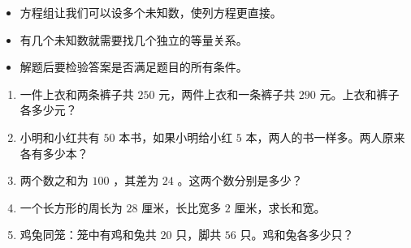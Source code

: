 \begin{keytakeaway}


\begin{itemize}
  \item 方程组让我们可以设多个未知数，使列方程更直接。
  \item 有几个未知数就需要找几个独立的等量关系。
  \item 解题后要检验答案是否满足题目的所有条件。
\end{itemize}


\end{keytakeaway}

\begin{practice}


\begin{enumerate}
  \item 一件上衣和两条裤子共 $250$ 元，两件上衣和一条裤子共 $290$ 元。上衣和裤子各多少元？
  \item 小明和小红共有 $50$ 本书，如果小明给小红 $5$ 本，两人的书一样多。两人原来各有多少本？
  \item 两个数之和为 $100$ ，其差为 $24$ 。这两个数分别是多少？
  \item 一个长方形的周长为 $28$ 厘米，长比宽多 $2$ 厘米，求长和宽。
  \item 鸡兔同笼：笼中有鸡和兔共 $20$ 只，脚共 $56$ 只。鸡和兔各多少只？
\end{enumerate}


\end{practice}



